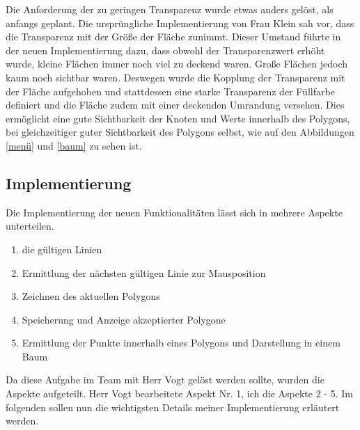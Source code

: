 Die Anforderung der zu geringen Transparenz wurde etwas anders gelöst, als anfangs geplant. Die ursprüngliche Implementierung von Frau Klein sah vor, dass die Transparenz mit der Größe der Fläche zunimmt. Dieser Umstand führte in der neuen Implementierung dazu, dass obwohl der Transparenzwert erhöht wurde, kleine Flächen immer noch viel zu deckend waren. Große Flächen jedoch kaum noch sichtbar waren. Deswegen wurde die Kopplung der Transparenz mit der Fläche aufgehoben und stattdessen eine starke Transparenz der Füllfarbe definiert und die Fläche zudem mit einer deckenden Umrandung versehen. Dies ermöglicht eine gute Sichtbarkeit der Knoten und Werte innerhalb des Polygons, bei gleichzeitiger guter Sichtbarkeit des Polygons selbst, wie auf den Abbildungen \ref{menü} und \ref{baum} zu sehen ist.



\subsection{Implementierung}

Die Implementierung der neuen Funktionalitäten lässt sich in mehrere Aspekte unterteilen.
\begin{enumerate}
\item die gültigen Linien
\item Ermittlung der nächsten gültigen Linie zur Mausposition
\item Zeichnen des aktuellen Polygons
\item Speicherung und Anzeige akzeptierter Polygone
\item Ermittlung der Punkte innerhalb eines Polygons und Darstellung in einem Baum
\end{enumerate}

Da diese Aufgabe im Team mit Herr Vogt gelöst werden sollte, wurden die Aspekte aufgeteilt. Herr Vogt bearbeitete Aspekt Nr. 1, ich die Aspekte 2 - 5. Im folgenden sollen nun die wichtigsten Details meiner Implementierung erläutert werden.

